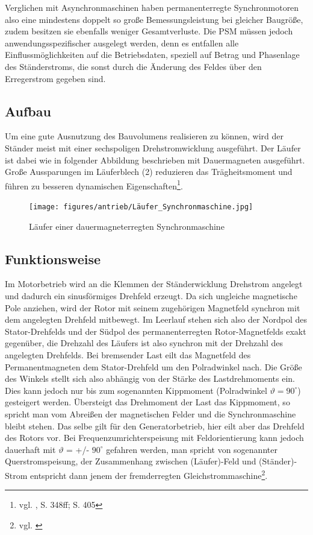 Verglichen mit Asynchronmaschinen haben permanenterregte Synchronmotoren also eine mindestens doppelt so große Bemessungsleistung bei gleicher Baugröße, zudem besitzen sie ebenfalls weniger Gesamtverluste. Die PSM müssen jedoch anwendungsspezifischer ausgelegt werden, denn es entfallen alle Einflussmöglichkeiten auf die Betriebsdaten, speziell auf Betrag und Phasenlage des Ständerstroms, die sonst durch die Änderung des Feldes über den Erregerstrom gegeben sind.

\subsection{Aufbau}
Um eine gute Ausnutzung des Bauvolumens realisieren zu können, wird der Ständer meist mit einer sechspoligen Drehstromwicklung ausgeführt. Der Läufer ist dabei wie in folgender Abbildung beschrieben mit Dauermagneten ausgeführt. Große Aussparungen im Läuferblech (2) reduzieren das Trägheitsmoment und führen zu besseren dynamischen Eigenschaften\footnote{vgl. \cite{Fischer}, S. 348ff; S. 405}.
\\[3mm]
\begin{figure}[H]
	\begin{center}
		\texttt{[image: figures/antrieb/Läufer\_Synchronmaschine.jpg]}
		\caption{Läufer einer dauermagneterregten Synchronmaschine \cite{Fischer}}
	\end{center}
\end{figure}

\subsection{Funktionsweise}
Im Motorbetrieb wird an die Klemmen der Ständerwicklung Drehstrom angelegt und dadurch ein sinusförmiges Drehfeld erzeugt. Da sich ungleiche magnetische Pole anziehen, wird der Rotor mit seinem zugehörigen Magnetfeld synchron mit dem angelegten Drehfeld mitbewegt. Im Leerlauf stehen sich also der Nordpol des Stator-Drehfelds und der Südpol des permanenterregten Rotor-Magnetfelds exakt gegenüber, die Drehzahl des Läufers ist also synchron mit der Drehzahl des angelegten Drehfelds. Bei bremsender Last eilt das Magnetfeld des Permanentmagneten dem Stator-Drehfeld um den Polradwinkel nach. Die Größe des Winkels stellt sich also abhängig von der Stärke des Lastdrehmoments ein. Dies kann jedoch nur bis zum sogenannten Kippmoment (Polradwinkel $\vartheta = 90^\circ$) gesteigert werden. Übersteigt das Drehmoment der Last das Kippmoment, so spricht man vom \glqq Abreißen\grqq{} der magnetischen Felder und die Synchronmaschine bleibt stehen. Das selbe gilt für den Generatorbetrieb, hier eilt aber das Drehfeld des Rotors vor. Bei Frequenzumrichterspeisung mit Feldorientierung kann jedoch dauerhaft mit $\vartheta$ = +/- $90^\circ$ gefahren werden, man spricht von sogenannter Querstromspeisung, der Zusammenhang zwischen (Läufer)-Feld und (Ständer)-Strom entspricht dann jenem der fremderregten Gleichstrommaschine\footnote{vgl. \cite{Synchronmaschine}}.

